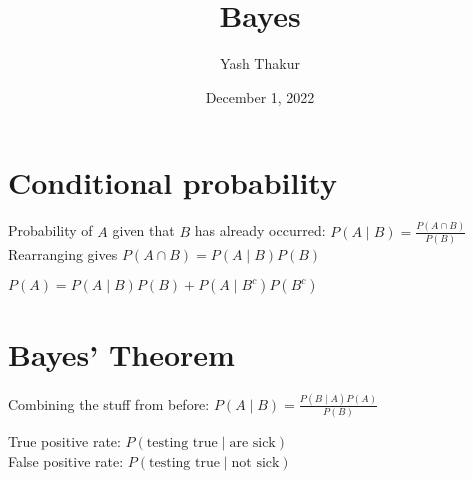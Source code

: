 \documentclass[12pt, leqno]{article}
\title{Bayes}
\author{Yash Thakur}
\date{December 1, 2022}
\begin{document}

\maketitle

\section*{Conditional probability}

Probability of $A$ given that $B$ has already occurred:
$\displaystyle P(A \mid B) = \frac{P(A \cap B)}{P(B)}$\\
Rearranging gives $P(A \cap B) = P(A \mid B)P(B)$

$P(A) = P(A \mid B)P(B) + P(A \mid B^c)P(B^c)$

\section*{Bayes' Theorem}

Combining the stuff from before: $\displaystyle P(A \mid B) = \frac{P(B \mid A)P(A)}{P(B)}$

True positive rate: $P(\text{testing true} \mid \text{are sick})$\\
False positive rate: $P(\text{testing true} \mid \text{not sick})$
\end{document}
